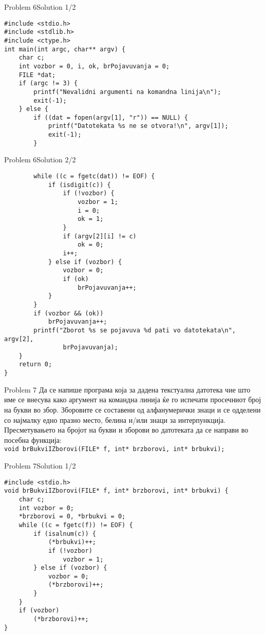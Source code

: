 \begin{frame}[fragile]{Problem 6}{Solution 1/2}
\begin{lstlisting}
#include <stdio.h>
#include <stdlib.h>
#include <ctype.h>
int main(int argc, char** argv) {
    char c;
    int vozbor = 0, i, ok, brPojavuvanja = 0;
    FILE *dat;
    if (argc != 3) {
        printf("Nevalidni argumenti na komandna linija\n");
        exit(-1);
    } else {
        if ((dat = fopen(argv[1], "r")) == NULL) {
            printf("Datotekata %s ne se otvora!\n", argv[1]);
            exit(-1);
        }
\end{lstlisting}
\end{frame}

\begin{frame}[fragile]{Problem 6}{Solution 2/2}
\begin{lstlisting}
        while ((c = fgetc(dat)) != EOF) {
            if (isdigit(c)) {
                if (!vozbor) {
                    vozbor = 1;
                    i = 0;
                    ok = 1;
                }
                if (argv[2][i] != c)
                    ok = 0;
                i++;
            } else if (vozbor) {
                vozbor = 0;
                if (ok)
                    brPojavuvanja++;
            }
        }
        if (vozbor && (ok))
            brPojavuvanja++;
        printf("Zborot %s se pojavuva %d pati vo datotekata\n", argv[2],
                brPojavuvanja);
    }
    return 0;
}

\end{lstlisting}
\end{frame}

\begin{frame}{Problem 7}
Да се напише програма која за дадена текстуална датотека чие што име се внесува
како аргумент на командна линија ќе го испечати просечниот број на  букви во
збор. Зборовите се составени од алфанумерички знаци и се одделени со најмалку
едно празно место, белина и/или знаци за интерпункција. Пресметувањето на бројот
на букви и зборови во датотеката да се направи во посебна функција:\\[.5cm]

\texttt{\scriptsize{void brBukviIZborovi(FILE* f, int* brzborovi, int*
brbukvi);}}

\end{frame}

\begin{frame}[fragile]{Problem 7}{Solution 1/2}
\begin{lstlisting}
#include <stdio.h>
void brBukviIZborovi(FILE* f, int* brzborovi, int* brbukvi) {
    char c;
    int vozbor = 0;
    *brzborovi = 0, *brbukvi = 0;
    while ((c = fgetc(f)) != EOF) {
        if (isalnum(c)) {
            (*brbukvi)++;
            if (!vozbor)
                vozbor = 1;
        } else if (vozbor) {
            vozbor = 0;
            (*brzborovi)++;
        }
    }
    if (vozbor)
        (*brzborovi)++;
}
\end{lstlisting}
\end{frame}

